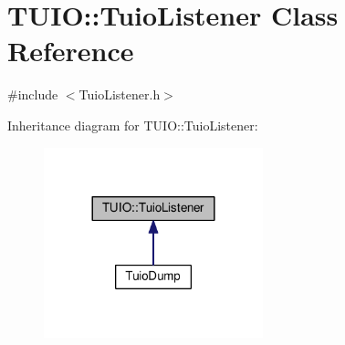 \hypertarget{class_t_u_i_o_1_1_tuio_listener}{}\section{T\+U\+IO\+:\+:Tuio\+Listener Class Reference}
\label{class_t_u_i_o_1_1_tuio_listener}


{\ttfamily \#include $<$Tuio\+Listener.\+h$>$}



Inheritance diagram for T\+U\+IO\+:\+:Tuio\+Listener\+:\nopagebreak
\begin{figure}[H]
\begin{center}
\leavevmode
\includegraphics[width=180pt]{class_t_u_i_o_1_1_tuio_listener__inherit__graph}
\end{center}
\end{figure}
